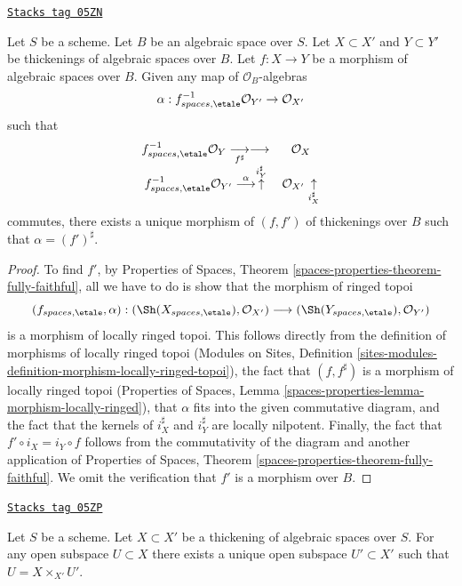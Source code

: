 \begin{lemma}
\label{spaces-more-morphisms-lemma-first-order-thickening-maps}
\href{https://stacks.math.columbia.edu/tag/05ZN}{\texttt{Stacks tag 05ZN}}

Let $S$ be a scheme. Let $B$ be an algebraic space over $S$.
Let $X \subset X'$ and $Y \subset Y'$ be thickenings
of algebraic spaces over $B$. Let $f : X \to Y$ be a morphism of algebraic
spaces over $B$. Given any map of $\mathcal{O}_B$-algebras
$$
\alpha : f_{spaces, \etale}^{-1}\mathcal{O}_{Y'} \to \mathcal{O}_{X'}
$$
such that
$$
\begin{array}{cc}f_{spaces, \etale}^{-1}\mathcal{O}_Y \underset{f^\sharp}{\longrightarrow}\longrightarrow & \mathcal{O}_X \\ f_{spaces, \etale}^{-1}\mathcal{O}_{Y'} \overset{\alpha}{\longrightarrow}\overset{i_Y^\sharp}{\uparrow} & \mathcal{O}_{X'} \underset{i_X^\sharp}{\uparrow}\end{array}
$$
commutes, there exists a unique morphism of $(f, f')$ of
thickenings over $B$ such that $\alpha = (f')^\sharp$.
\end{lemma}

\begin{proof}
To find $f'$, by
Properties of Spaces, Theorem \ref{spaces-properties-theorem-fully-faithful},
all we have to do is show that the morphism of ringed topoi
$$
(f_{spaces, \etale}, \alpha) :
(\Sh(X_{spaces, \etale}), \mathcal{O}_{X'})
\longrightarrow
(\Sh(Y_{spaces, \etale}), \mathcal{O}_{Y'})
$$
is a morphism of locally ringed topoi. This follows directly
from the definition of morphisms of locally ringed topoi
(Modules on Sites,
Definition \ref{sites-modules-definition-morphism-locally-ringed-topoi}),
the fact that $(f, f^\sharp)$ is a morphism of locally ringed topoi
(Properties of Spaces,
Lemma \ref{spaces-properties-lemma-morphism-locally-ringed}),
that $\alpha$ fits into the given commutative diagram, and
the fact that the kernels of $i_X^\sharp$ and $i_Y^\sharp$ are
locally nilpotent. Finally, the fact that $f' \circ i_X = i_Y \circ f$
follows from the commutativity of the diagram and another application of
Properties of Spaces, Theorem \ref{spaces-properties-theorem-fully-faithful}.
We omit the verification that $f'$ is a morphism over $B$.
\end{proof}

\begin{lemma}
\label{spaces-more-morphisms-lemma-open-subspace-thickening}
\href{https://stacks.math.columbia.edu/tag/05ZP}{\texttt{Stacks tag 05ZP}}

Let $S$ be a scheme. Let $X \subset X'$ be a thickening
of algebraic spaces over $S$. For any open subspace $U \subset X$ there
exists a unique open subspace $U' \subset X'$ such that
$U = X \times_{X'} U'$.
\end{lemma}


